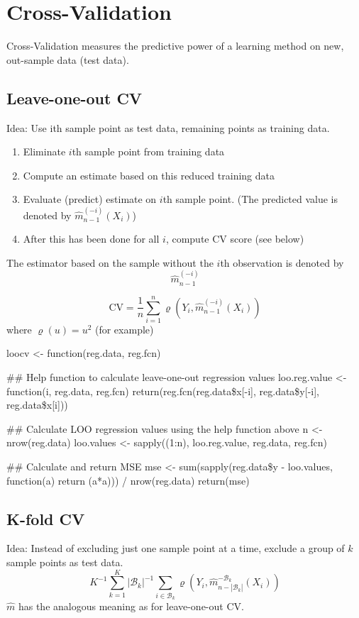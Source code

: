 \section{Cross-Validation}
Cross-Validation measures the predictive power of a learning method on new, out-sample data (test data).
\subsection{Leave-one-out CV}
\begin{theory}
 Idea: Use ith sample point as test data, remaining points as training data.
 \begin{enumerate}
  \item Eliminate $i$th sample point from training data
  \item Compute an estimate based on this reduced training data
  \item Evaluate (predict) estimate on $i$th sample point. (The predicted value is denoted by $\hat{m}_{n-1}^{(-i)}(X_i)$)
  \item After this has been done for all $i$, compute CV score (see below)
 \end{enumerate}
 The estimator based on the sample without the $i$th observation is denoted by
 \begin{equation*}
  \hat{m}_{n-1}^{(-i)}
 \end{equation*}

 \begin{equation}
  \text{CV} = \frac{1}{n} \sum_{i=1}^n\varrho \left( Y_i, \hat{m}_{n-1}^{(-i)}(X_i)  \right)
  \label{eq:leave_one_out_cv}
 \end{equation}
 where $\varrho(u) = u^2$ (for example)
\end{theory}
\begin{code}
loocv <- function(reg.data, reg.fcn)
{
  ## Help function to calculate leave-one-out regression values
  loo.reg.value <- function(i, reg.data, reg.fcn)
    return(reg.fcn(reg.data\$x[-i], reg.data\$y[-i], reg.data\$x[i]))
  
  ## Calculate LOO regression values using the help function above
  n <- nrow(reg.data)
  loo.values <- sapply((1:n), loo.reg.value, reg.data, reg.fcn)
  
  ## Calculate and return MSE
  mse <- sum(sapply(reg.data\$y - loo.values, function(a) return (a*a))) / nrow(reg.data)
  return(mse)
}
\end{code}

\subsection{K-fold CV}
\begin{theory}
 Idea: Instead of excluding just one sample point at a time, exclude a group of $k$ sample points as test data.
 \begin{equation*}
  K^{-1} \sum_{k=1}^K |\mathcal{B}_k|^{-1} \sum_{i\in\mathcal{B}_k} \varrho \left( Y_i, \hat{m}_{n-|\mathcal{B}_k|}^{-\mathcal{B}_k} (X_i) \right)
 \end{equation*}
 $\hat{m}$ has the analogous meaning as for leave-one-out CV.
\end{theory}

